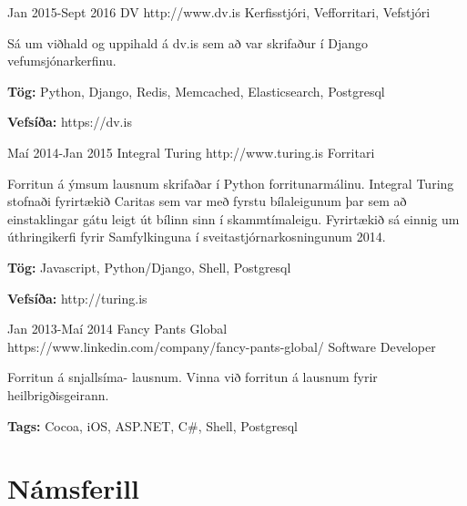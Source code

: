 \documentclass[10pt]{article} %
\begin{document}

\job
{Jan 2015-}{Sept 2016}
{DV}
{http://www.dv.is}
{Kerfisstjóri, Vefforritari, Vefstjóri}
{Sá um viðhald og uppihald á dv.is sem að var skrifaður í Django vefumsjónarkerfinu.\\
\rule{0mm}{5mm}\textbf{Tög:} Python, Django, Redis, Memcached, Elasticsearch, Postgresql\\
\rule{0mm}{5mm}\textbf{Vefsíða:} https://dv.is
}


\job
{Maí 2014-}{Jan 2015}
{Integral Turing}
{http://www.turing.is}
{Forritari}
{Forritun á ýmsum lausnum skrifaðar í Python forritunarmálinu. Integral Turing stofnaði fyrirtækið Caritas sem var með fyrstu bílaleigunum þar sem að einstaklingar gátu leigt út bílinn sinn í skammtímaleigu. Fyrirtækið sá einnig um úthringikerfi fyrir Samfylkinguna í sveitastjórnarkosningunum 2014. \\
\rule{0mm}{5mm}\textbf{Tög:} Javascript, Python/Django, Shell, Postgresql\\
\rule{0mm}{5mm}\textbf{Vefsíða:} http://turing.is
}


\job
{Jan 2013-}{Maí 2014}
{Fancy Pants Global}
{https://www.linkedin.com/company/fancy-pants-global/}
{Software Developer}
{Forritun á snjallsíma- lausnum. Vinna við forritun á lausnum fyrir heilbrigðisgeirann.\\
\rule{0mm}{5mm}\textbf{Tags:} Cocoa, iOS, ASP.NET, C\#, Shell, Postgresql}


\newpage
\section{Námsferill}


\end{document}
